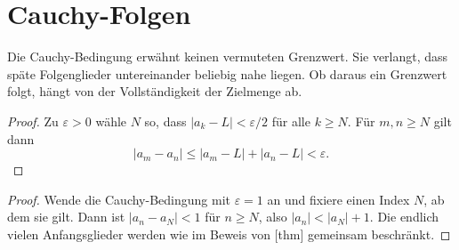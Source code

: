 \documentclass[main.tex]{subfiles}
\begin{document}
\section{Cauchy-Folgen}


Die Cauchy-Bedingung erwähnt keinen vermuteten Grenzwert. Sie verlangt, dass
späte Folgenglieder untereinander beliebig nahe liegen. Ob daraus ein
Grenzwert folgt, hängt von der Vollständigkeit der Zielmenge ab.

\begin{proof}
Zu \(\varepsilon>0\) wähle \(N\) so, dass
\(|a_k-L|<\varepsilon/2\) für alle \(k\geq N\). Für \(m,n\geq N\) gilt
dann
\[
 |a_m-a_n|\leq|a_m-L|+|a_n-L|<\varepsilon.
\]
\end{proof}

\begin{proof}
Wende die Cauchy-Bedingung mit \(\varepsilon=1\) an und fixiere einen Index
\(N\), ab dem sie gilt. Dann ist \(|a_n-a_N|<1\) für \(n\geq N\), also
\(|a_n|<|a_N|+1\). Die endlich vielen Anfangsglieder werden wie im Beweis
von [thm] gemeinsam
beschränkt.
\end{proof}
\end{document}

